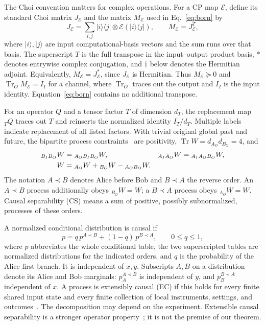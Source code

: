 \documentclass[11pt]{article}
\newcommand{\Tr}{\operatorname{Tr}}
\begin{document}
The Choi convention matters for complex operations. For a CP map $\mathcal E$, define its standard Choi matrix $J_{\mathcal E}$ and the matrix $M_{\mathcal E}$ used in Eq.~\eqref{eq:born} by
\begin{equation}
 J_{\mathcal E}=\sum_{i,j}|i\rangle\langle j|\otimes
 \mathcal E(|i\rangle\langle j|),\qquad M_{\mathcal E}=J_{\mathcal E}^{T},
 \label{eq:choi-convention}
\end{equation}
where $|i\rangle,|j\rangle$ are input computational-basis vectors and the sum runs over that basis. The superscript $T$ is the full transpose in the input--output product basis, $*$ denotes entrywise complex conjugation, and $\dagger$ below denotes the Hermitian adjoint. Equivalently, $M_{\mathcal E}=J_{\mathcal E}^*$, since $J_{\mathcal E}$ is Hermitian. Thus $M_{\mathcal E}\succeq0$ and $\Tr_O M_{\mathcal E}=I_I$ for a channel, where $\Tr_O$ traces out the output and $I_I$ is the input identity. Equation~\eqref{eq:born} contains no additional transpose.

For an operator $Q$ and a tensor factor $T$ of dimension $d_T$, the replacement map \({}_T Q\) traces out $T$ and reinserts the normalized identity $I_T/d_T$. Multiple labels indicate replacement of all listed factors. With trivial original global past and future, the bipartite process constraints~\cite{OCB,EC} are positivity, $\Tr W=d_{A_O}d_{B_O}=4$, and
\begin{align}
 {}_{B_IB_O}W&={}_{A_OB_IB_O}W,&
 {}_{A_IA_O}W&={}_{A_IA_OB_O}W,\notag\\
 W&={}_{A_O}W+{}_{B_O}W-{}_{A_OB_O}W.
 \label{eq:process-subspace}
\end{align}
The notation $A\prec B$ denotes Alice before Bob and $B\prec A$ the reverse order. An $A\prec B$ process additionally obeys \({}_{B_O}W=W\); a $B\prec A$ process obeys \({}_{A_O}W=W\). Causal separability (CS) means a sum of positive, possibly subnormalized, processes of these orders.

A normalized conditional distribution is causal if
\begin{equation}
 p=q\,p^{A\prec B}+(1-q)\,p^{B\prec A},\qquad 0\le q\le1,
 \label{eq:causal-table}
\end{equation}
where $p$ abbreviates the whole conditional table, the two superscripted tables are normalized distributions for the indicated orders, and $q$ is the probability of the Alice-first branch. It is independent of $x,y$. Subscripts $A,B$ on a distribution denote its Alice and Bob marginals: $p_A^{A\prec B}$ is independent of $y$, and $p_B^{B\prec A}$ independent of $x$. A process is extensibly causal (EC) if this holds for every finite shared input state and every finite collection of local instruments, settings, and outcomes~\cite{EC}. The decomposition may depend on the experiment. Extensible causal separability is a stronger operator property~\cite{Wechs,Wei}; it is not the premise of our theorem.
\end{document}
